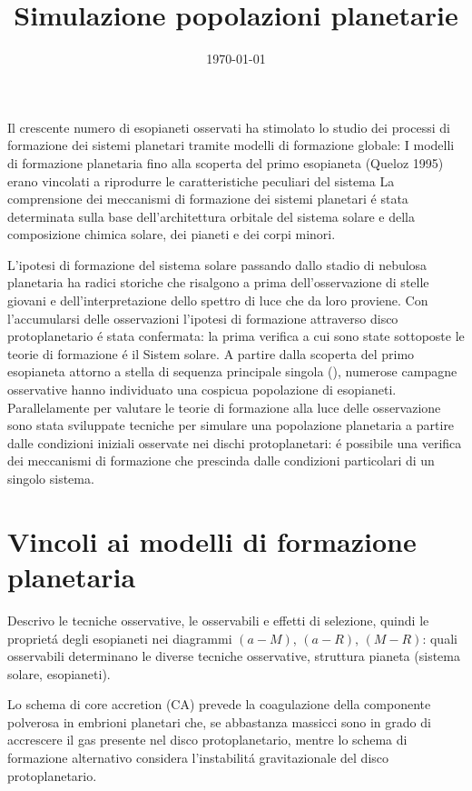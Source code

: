 \documentclass[twoside,11pt,fleqn]{memoir}%
\author{ }
\title{Simulazione popolazioni planetarie}
\date{\today}
\begin{document}
\maketitle
{}
\tableofcontents*
\mainmatter
{}
\cleartorecto

\begin{errata}
Il crescente numero di esopianeti osservati ha stimolato lo studio dei processi di formazione dei sistemi planetari tramite modelli di formazione globale: 
I modelli di formazione planetaria fino alla scoperta del primo esopianeta (Queloz 1995) erano vincolati a riprodurre le caratteristiche peculiari del sistema
La comprensione dei meccanismi di formazione dei sistemi planetari \'e stata determinata sulla base dell'architettura orbitale del sistema solare e della composizione chimica solare, dei pianeti e dei corpi minori.
\end{errata}

L'ipotesi di formazione del sistema solare passando dallo stadio di nebulosa planetaria ha radici storiche che risalgono a prima dell'osservazione di stelle giovani e dell'interpretazione dello spettro di luce che da loro proviene. Con l'accumularsi delle osservazioni l'ipotesi di formazione attraverso disco protoplanetario \'e stata confermata: la prima verifica a cui sono state sottoposte le teorie di formazione \'e il Sistem solare.
A partire dalla scoperta del primo esopianeta attorno a stella di sequenza principale singola (\cite{mayor1995jupiter}), numerose campagne osservative hanno individuato una cospicua popolazione di esopianeti. Parallelamente per valutare le teorie di formazione alla luce delle osservazione sono stata sviluppate tecniche per simulare una popolazione planetaria a partire dalle condizioni iniziali osservate nei dischi protoplanetari: \'e possibile una verifica dei meccanismi di formazione che prescinda dalle condizioni particolari di un singolo sistema.

{\let\clearpage\relax\let\cleardoublepage\relax
\part{Vincoli ai modelli di formazione planetaria}
}
\begin{errata}
Descrivo le tecniche osservative, le osservabili e effetti di selezione, quindi le propriet\'a degli esopianeti nei diagrammi $(a-M)$, $(a-R)$, $(M-R)$: quali osservabili determinano le diverse tecniche osservative, struttura pianeta (sistema solare, esopianeti).
\end{errata}
Lo schema di core accretion (CA) prevede la coagulazione della componente polverosa in embrioni planetari che, se abbastanza massicci sono in grado di accrescere il gas presente nel disco protoplanetario, mentre lo schema di formazione alternativo considera l'instabilit\'a gravitazionale del disco protoplanetario.
\end{document}
